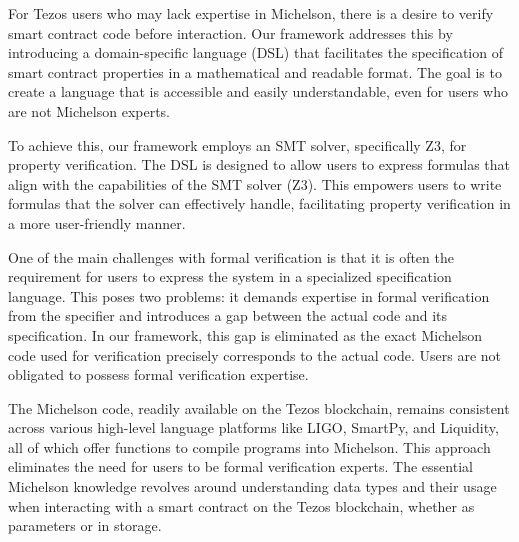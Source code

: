 \documentclass[a4paper,UKenglish,cleveref, autoref, thm-restate]{lipics-v2021}
\begin{document}
For Tezos users who may lack expertise in Michelson, there is a desire to verify smart contract code before interaction. Our framework addresses this by introducing a domain-specific language (DSL) that facilitates the specification of smart contract properties in a mathematical and readable format. The goal is to create a language that is accessible and easily understandable, even for users who are not Michelson experts.

To achieve this, our framework employs an SMT solver, specifically Z3, for property verification. The DSL is designed to allow users to express formulas that align with the capabilities of the SMT solver (Z3). This empowers users to write formulas that the solver can effectively handle, facilitating property verification in a more user-friendly manner.

One of the main challenges with formal verification is that it is often the requirement for users to express the system in a specialized specification language. This poses two problems: it demands expertise in formal verification from the specifier and introduces a gap between the actual code and its specification. In our framework, this gap is eliminated as the exact Michelson code used for verification precisely corresponds to the actual code.  Users are not obligated to possess formal verification expertise. 

The Michelson code, readily available on the Tezos blockchain, remains consistent across various high-level language platforms like LIGO, SmartPy, and Liquidity, all of which offer functions to compile programs into Michelson. This approach eliminates the need for users to be formal verification experts. The essential Michelson knowledge revolves around understanding data types and their usage when interacting with a smart contract on the Tezos blockchain, whether as parameters or in storage.
\end{document}
